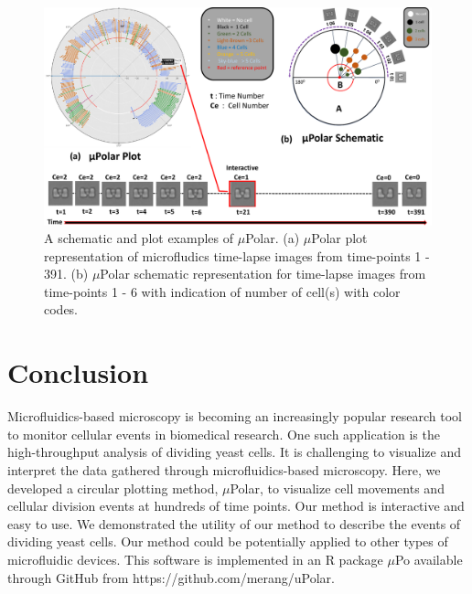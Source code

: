 \documentclass[conference]{IEEEtran}
\begin{document}
\begin{figure}
\centering
\includegraphics[width=\textwidth,height=10 cm]{Patterns/polar.pdf}
\caption{A schematic and plot examples of $\mu$Polar. (a) $\mu$Polar plot representation of microfludics time-lapse images from time-points 1 - 391. (b) $\mu$Polar schematic representation for time-lapse images from time-points 1 - 6 with indication of number of cell(s) with color codes.}
\label{fig:polar}
\end{figure}


\section{Conclusion}
Microfluidics-based microscopy is becoming an increasingly popular research tool to monitor cellular events in biomedical research. One such application is the high-throughput analysis of dividing yeast cells. It is challenging to visualize and interpret the data gathered through microfluidics-based microscopy. Here, we developed a circular plotting method, $\mu$Polar, to visualize cell movements and cellular division events at hundreds of time points. Our method is interactive and easy to use. We demonstrated the utility of our method to describe the events of dividing yeast cells. Our method could be potentially applied to other types of microfluidic devices.
This software is implemented in an R package $\mu$Po available through GitHub from https://github.com/merang/uPolar.


\end{document}
